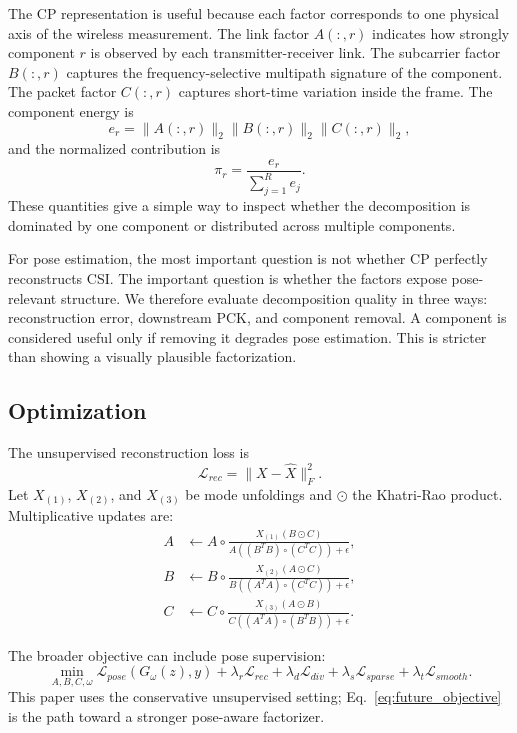 \documentclass[10pt,conference]{IEEEtran}
\begin{document}
The CP representation is useful because each factor corresponds to one physical axis of the wireless measurement. The link factor $A(:,r)$ indicates how strongly component $r$ is observed by each transmitter-receiver link. The subcarrier factor $B(:,r)$ captures the frequency-selective multipath signature of the component. The packet factor $C(:,r)$ captures short-time variation inside the frame. The component energy is
\begin{equation}
e_r=\|A(:,r)\|_2\|B(:,r)\|_2\|C(:,r)\|_2,
\end{equation}
and the normalized contribution is
\begin{equation}
\pi_r=\frac{e_r}{\sum_{j=1}^{R} e_j}.
\end{equation}
These quantities give a simple way to inspect whether the decomposition is dominated by one component or distributed across multiple components.

For pose estimation, the most important question is not whether CP perfectly reconstructs CSI. The important question is whether the factors expose pose-relevant structure. We therefore evaluate decomposition quality in three ways: reconstruction error, downstream PCK, and component removal. A component is considered useful only if removing it degrades pose estimation. This is stricter than showing a visually plausible factorization.

\subsection{Optimization}

The unsupervised reconstruction loss is
\begin{equation}
\mathcal{L}_{rec}=\|X-\hat{X}\|_F^2.
\end{equation}
Let $X_{(1)}$, $X_{(2)}$, and $X_{(3)}$ be mode unfoldings and $\odot$ the Khatri-Rao product. Multiplicative updates are:
\begin{align}
A &\leftarrow A\circ
\frac{X_{(1)}(B\odot C)}
{A((B^TB)\circ(C^TC))+\epsilon},\\
B &\leftarrow B\circ
\frac{X_{(2)}(A\odot C)}
{B((A^TA)\circ(C^TC))+\epsilon},\\
C &\leftarrow C\circ
\frac{X_{(3)}(A\odot B)}
{C((A^TA)\circ(B^TB))+\epsilon}.
\end{align}

The broader objective can include pose supervision:
\begin{equation}
\min_{A,B,C,\omega}
\mathcal{L}_{pose}(G_\omega(z),y)
+\lambda_r\mathcal{L}_{rec}
+\lambda_d\mathcal{L}_{div}
+\lambda_s\mathcal{L}_{sparse}
+\lambda_t\mathcal{L}_{smooth}.
\label{eq:future_objective}
\end{equation}
This paper uses the conservative unsupervised setting; Eq.~\ref{eq:future_objective} is the path toward a stronger pose-aware factorizer.
\end{document}
